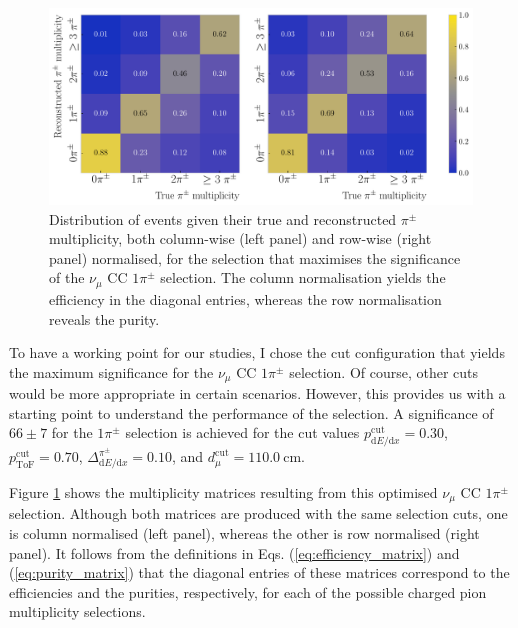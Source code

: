 \begin{figure}[t]
    \centering
    \includegraphics[width=.99\linewidth]{Images/GAr_selection/pion_selection_metrics_matrix_max_significance.pdf}
    \caption[Row and column normalised distributions of events given their true and reconstructed $\pi^{\pm}$ multiplicity, for the selection that maximises the significance of the $\nu_{\mu}$ CC $1\pi^{\pm}$ selection.]{Distribution of events given their true and reconstructed $\pi^{\pm}$ multiplicity, both column-wise (left panel) and row-wise (right panel) normalised, for the selection that maximises the significance of the $\nu_{\mu}$ CC $1\pi^{\pm}$ selection. The column normalisation yields the efficiency in the diagonal entries, whereas the row normalisation reveals the purity.}
    \label{fig:pion_selection_metrics}
\end{figure}

To have a working point for our studies, I chose the cut configuration that yields the maximum significance for the $\nu_{\mu}$ CC $1\pi^{\pm}$ selection. Of course, other cuts would be more appropriate in certain scenarios. However, this provides us with a starting point to understand the performance of the selection. A significance of $66\pm7$ for the $1\pi^{\pm}$ selection is achieved for the cut values $p^{\mathrm{cut}}_{\mathrm{d}E/\mathrm{d}x} = 0.30$, $p^{\mathrm{cut}}_{\mathrm{ToF}} = 0.70$, $\Delta^{\pi^{\pm}}_{\mathrm{d}E/\mathrm{d}x} = 0.10$, and $d^{\mathrm{cut}}_{\mu} = 110.0~\mathrm{cm}$.

Figure \ref{fig:pion_selection_metrics} shows the multiplicity matrices resulting from this optimised $\nu_{\mu}$ CC $1\pi^{\pm}$ selection. Although both matrices are produced with the same selection cuts, one is column normalised (left panel), whereas the other is row normalised (right panel). It follows from the definitions in Eqs. (\ref{eq:efficiency_matrix}) and (\ref{eq:purity_matrix}) that the diagonal entries of these matrices correspond to the efficiencies and the purities, respectively, for each of the possible charged pion multiplicity selections.


